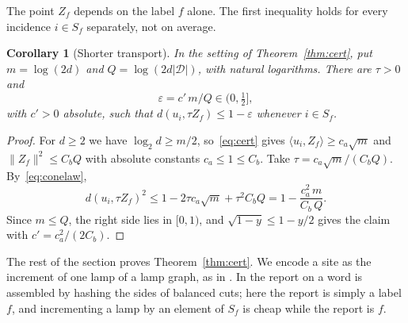 \documentclass[11pt]{article}
\newtheorem{corollary}[theorem]{Corollary}
\theoremstyle{remark}
\newcommand{\cD}{\mathcal D}
\newcommand{\ip}[2]{\langle #1,#2\rangle}
\newcommand{\norm}[1]{\lVert #1\rVert}
\begin{document}
The point \(Z_f\) depends on the label \(f\) alone. The first inequality
holds for every incidence \(i\in S_f\) separately, not on average.

\begin{corollary}[Shorter transport]\label{cor:transport}
In the setting of Theorem~\ref{thm:cert}, put \(m=\log(2d)\) and
\(Q=\log(2d|\cD|)\), with natural logarithms. There are \(\tau>0\) and
\[
 \varepsilon=c'\,m/Q\in(0,\tfrac12],
\]
with \(c'>0\) absolute, such that \(d(u_i,\tau Z_f)\le1-\varepsilon\)
whenever \(i\in S_f\).
\end{corollary}

\begin{proof}
For \(d\ge2\) we have \(\log_2d\ge m/2\), so~\eqref{eq:cert} gives
\(\ip{u_i}{Z_f}\ge c_a\sqrt m\) and \(\norm{Z_f}^2\le C_bQ\) with absolute
constants \(c_a\le1\le C_b\). Take \(\tau=c_a\sqrt m/(C_bQ)\).
By~\eqref{eq:conelaw},
\[
 d(u_i,\tau Z_f)^2\le1-2\tau c_a\sqrt m+\tau^2C_bQ
  =1-\frac{c_a^2\,m}{C_b\,Q}.
\]
Since \(m\le Q\), the right side lies in \([0,1)\), and
\(\sqrt{1-y}\le1-y/2\) gives the claim with \(c'=c_a^2/(2C_b)\).
\end{proof}

The rest of the section proves Theorem~\ref{thm:cert}. We encode a site as
the increment of one lamp of a lamp graph, as in \cite[Section 7]{hc}.
In \cite{hc} the report on a word is assembled by hashing the sides of
balanced cuts; here the report is simply a label \(f\), and incrementing
a lamp by an element of \(S_f\) is cheap while the report is \(f\).
\end{document}
